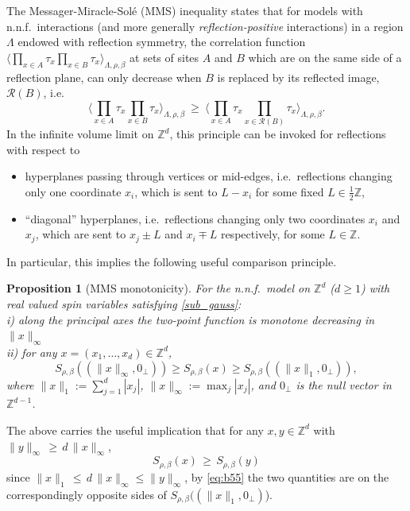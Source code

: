 \documentclass[a4paper,oneside,11pt]{article}
\def\Z{\mathbb{Z}}                          %
\newtheorem{proposition}[theorem]{Proposition}
\newcommand{\be}[1]{\begin{equation}\label{#1}}
\newcommand{\ee}{\end{equation}}
\numberwithin{equation}{section}
\numberwithin{equation}{section}
\numberwithin{equation}{section}
\newcommand{\calR}{\mathcal{R}}
\newcommand{\bbZ}{\mathbb{Z}}
\def\Z{\mathbb{Z}}                          %
\def\be{\begin{equation}}
\def\ee{\end{equation}}
\begin{document}
The Messager-Miracle-Sol\'e (MMS) inequality \cite{Heg77,MesMir77,Sch77} states that for models with n.n.f.~interactions (and more generally \emph{reflection-positive} interactions)
in a region $\Lambda$ endowed with reflection symmetry,  
the correlation function $\langle \prod_{x\in A}\tau_x\prod_{x\in B}\tau_x\rangle _{\Lambda,\rho,\beta}$ at sets of sites $A$ and $B$ which are on the same side of a reflection plane, can only decrease when $B$ is replaced by its reflected image, $\mathcal{R}(B)$, i.e.
\begin{equation}\label{eq:MMS}
\big\langle \prod_{x\in A}\tau_x\prod_{x\in B}\tau_x\big\rangle_{\Lambda,\rho,\beta}  \ \geq \ \big\langle \prod_{x\in A}\tau_x\prod_{x\in \calR(B)}\tau_x\big\rangle_{\Lambda,\rho,\beta}. 
\end{equation}   In the infinite volume limit on $\Z^d$,  this principle can be invoked for reflections with respect to 
\begin{itemize}[noitemsep,nolistsep]
\item hyperplanes passing through vertices or mid-edges, i.e.~reflections changing only one coordinate $x_i$, which is sent to $L-x_i$ for some fixed $L\in\tfrac12\bbZ$, 
\item ``diagonal'' hyperplanes, i.e.~reflections changing only two coordinates $x_i$ and $x_j$, which are sent to $x_j\pm L$ and $x_i\mp L$ respectively, for some $L\in\bbZ$.
\end{itemize}
In particular, this  implies the following useful comparison principle. 

\begin{proposition}[MMS monotonicity]\label{prop:MMS}  
For the n.n.f.~model 
on $\Z^d$ ($d\ge1$) with real valued spin variables satisfying \eqref{sub_gauss}:\\ 
\indent  i)
along the principal axes 
the two-point function is monotone decreasing in $\|x\|_\infty$ 
\\ 
\indent ii) for any $x=(x_1,\dots,x_d) \in \Z^d$,
\begin{equation}\label{eq:b55}
S_{\rho,\beta}((\|x\|_\infty,0_\perp)) \geq S_{\rho,\beta}(x) \geq  S_{\rho,\beta}((\|x\|_1,0_\perp) ),
\end{equation}
where  $\|x\|_1 := \sum_{j=1}^d |x_j|$, $\|x\|_\infty:= \max_j |x_j|$, and $0_\perp$ is the null vector in  $\Z^{d-1}$.
\end{proposition} 

The above carries the useful implication  that for any $x,y\in \Z^d$ with $\|y\|_\infty \, \ge \,  d\,  \|x\|_\infty $,
\be  \label{eq:MMS3}
 S_{\rho,\beta}(x)\, \ge \, S_{\rho,\beta}(y)
\ee  
since $ \|x\|_1 \, \le \,  d\, \|x\|_\infty   \le   \|y\|_\infty  $, by \eqref{eq:b55} the two quantities are on the correspondingly opposite sides of $S_{\rho,\beta}((\|x\|_1,0_\perp)$).\\ 
\end{document}
